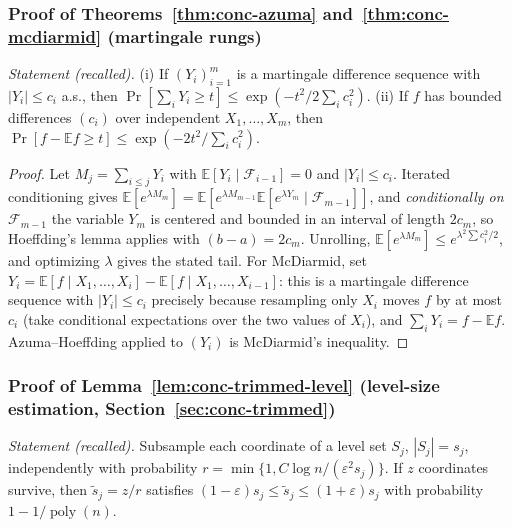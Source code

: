 \subsubsection*{Proof of Theorems~\ref{thm:conc-azuma} and~\ref{thm:conc-mcdiarmid} (martingale rungs)}
{\itshape Statement (recalled).} (i) If $(Y_i)_{i=1}^m$ is a martingale difference
sequence with $|Y_i| \le c_i$ a.s., then $\Pr[\sum_i Y_i \ge t] \le
\exp(-t^2/2\sum_i c_i^2)$. (ii) If $f$ has bounded differences $(c_i)$ over independent
$X_1,\dots,X_m$, then $\Pr[f - \mathbb{E}f \ge t] \le
\exp(-2t^2/\sum_i c_i^2)$.\eop

\begin{proof}
Let $M_j = \sum_{i \le j} Y_i$ with $\mathbb{E}[Y_i \mid \mathcal{F}_{i-1}] = 0$ and
$|Y_i| \le c_i$. Iterated conditioning gives
$\mathbb{E}[e^{\lambda M_m}] = \mathbb{E}[e^{\lambda M_{m-1}}
\mathbb{E}[e^{\lambda Y_m} \mid \mathcal{F}_{m-1}]]$, and \emph{conditionally on
$\mathcal{F}_{m-1}$} the variable $Y_m$ is centered and bounded in an interval of length
$2c_m$, so Hoeffding's lemma applies with $(b-a) = 2c_m$. Unrolling,
$\mathbb{E}[e^{\lambda M_m}] \le e^{\lambda^2\sum c_i^2/2}$, and optimizing $\lambda$
gives the stated tail. For McDiarmid, set $Y_i = \mathbb{E}[f \mid X_1,\dots,X_i] -
\mathbb{E}[f \mid X_1,\dots,X_{i-1}]$: this is a martingale difference sequence with
$|Y_i| \le c_i$ precisely because resampling only $X_i$ moves $f$ by at most $c_i$
(take conditional expectations over the two values of $X_i$), and
$\sum_i Y_i = f - \mathbb{E}f$. Azuma--Hoeffding applied to $(Y_i)$ is McDiarmid's
inequality.
\end{proof}

\subsubsection*{Proof of Lemma~\ref{lem:conc-trimmed-level} (level-size estimation,
Section~\ref{sec:conc-trimmed})}
{\itshape Statement (recalled).} Subsample each coordinate of a level set $S_j$,
$|S_j| = s_j$, independently with probability $r = \min\{1, C\log n/(\varepsilon^2
s_j)\}$. If $z$ coordinates survive, then $\tilde{s}_j = z/r$ satisfies
$(1-\varepsilon)s_j \le \tilde{s}_j \le (1+\varepsilon)s_j$ with probability
$1 - 1/\operatorname{poly}(n)$.\eop

